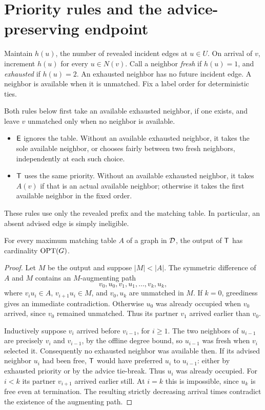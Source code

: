 \section{Priority rules and the advice-preserving endpoint}
Maintain $h(u)$, the number of revealed incident edges at $u\in U$.
On arrival of $v$, increment $h(u)$ for every $u\in N(v)$.
Call a neighbor \emph{fresh} if $h(u)=1$, and \emph{exhausted} if $h(u)=2$.
An exhausted neighbor has no future incident edge. A neighbor is available
when it is unmatched. Fix a label order for deterministic ties.

Both rules below first take an available exhausted neighbor, if one exists,
and leave $v$ unmatched only when no neighbor is available.
\begin{itemize}
\item $\mathsf{E}$ ignores the table. Without an available exhausted neighbor, it
      takes the sole available neighbor, or chooses fairly between two fresh
      neighbors, independently at each such choice.
\item $\mathsf{T}$ uses the same priority. Without an available exhausted neighbor,
      it takes $A(v)$ if that is an actual available neighbor; otherwise it
      takes the first available neighbor in the fixed order.
\end{itemize}
These rules use only the revealed prefix and the matching table. In
particular, an absent advised edge is simply ineligible.

\begin{lemma}\label{lem:advice}
For every maximum matching table $A$ of a graph in $\mathcal D$, the output of
$\mathsf{T}$ has cardinality $\operatorname{OPT}(G)$.
\end{lemma}
\begin{proof}
Let $M$ be the output and suppose $|M|<|A|$. The symmetric difference of
$A$ and $M$ contains an $M$-augmenting path
\[
 v_0,u_0,v_1,u_1,\ldots,v_k,u_k,
\]
where $v_i u_i\in A$, $v_{i+1}u_i\in M$, and $v_0,u_k$ are unmatched in
$M$. If $k=0$, greediness gives an immediate contradiction. Otherwise $u_0$
was already occupied when $v_0$ arrived, since $v_0$ remained unmatched.
Thus its partner $v_1$ arrived earlier than $v_0$.

Inductively suppose $v_i$ arrived before $v_{i-1}$, for $i\ge1$.
The two neighbors of $u_{i-1}$ are precisely $v_i$ and $v_{i-1}$, by the
offline degree bound, so $u_{i-1}$ was fresh when $v_i$ selected it.
Consequently no exhausted neighbor was available then. If its advised
neighbor $u_i$ had been free, $\mathsf{T}$ would have preferred $u_i$ to
$u_{i-1}$: either by exhausted priority or by the advice tie-break.
Thus $u_i$ was already occupied. For $i<k$ its partner $v_{i+1}$ arrived
earlier still. At $i=k$ this is impossible, since $u_k$ is free even at
termination. The resulting strictly decreasing arrival times contradict the
existence of the augmenting path.
\end{proof}

